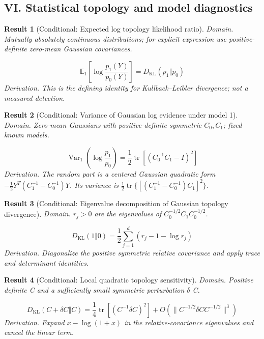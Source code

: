 \documentclass[aps,prd,onecolumn,notitlepage,groupedaddress,11pt]{revtex4-2}
\newtheorem{result}{Result}
\begin{document}
\subsection{VI. Statistical topology and model diagnostics}
\begin{result}[\textsf{Conditional}: Expected log topology likelihood ratio]\label{bridge:36}
\textit{Domain.} Mutually absolutely continuous distributions; for explicit expression use positive-definite zero-mean Gaussian covariances.\par
\begin{equation}\label{bridgeeq:36}
\mathbb E_{1}\left[\log\frac{p_1(Y)}{p_0(Y)}\right]=D_{\mathrm{KL}}(p_1\Vert p_0)
\end{equation}
\textit{Derivation.} This is the defining identity for Kullback--Leibler divergence; not a measured detection.
\end{result}
\begin{result}[\textsf{Conditional}: Variance of Gaussian log evidence under model 1]\label{bridge:37}
\textit{Domain.} Zero-mean Gaussians with positive-definite symmetric \(C_0,C_1\); fixed known models.\par
\begin{equation}\label{bridgeeq:37}
\operatorname{Var}_{1}\left(\log\frac{p_1}{p_0}\right)=\frac12\operatorname{tr}\left[(C_0^{-1}C_1-I)^2\right]
\end{equation}
\textit{Derivation.} The random part is a centered Gaussian quadratic form \(-\tfrac12Y^T(C_1^{-1}-C_0^{-1})Y\). Its variance is \(\tfrac12\operatorname{tr}\{[(C_1^{-1}-C_0^{-1})C_1]^2\}\).
\end{result}
\begin{result}[\textsf{Conditional}: Eigenvalue decomposition of Gaussian topology divergence]\label{bridge:38}
\textit{Domain.} \(r_j>0\) are the eigenvalues of \(C_0^{-1/2}C_1C_0^{-1/2}\).\par
\begin{equation}\label{bridgeeq:38}
D_{\mathrm{KL}}(1\Vert0)=\frac12\sum_{j=1}^{d}(r_j-1-\log r_j)
\end{equation}
\textit{Derivation.} Diagonalize the positive symmetric relative covariance and apply trace and determinant identities.
\end{result}
\begin{result}[\textsf{Conditional}: Local quadratic topology sensitivity]\label{bridge:39}
\textit{Domain.} Positive definite C and a sufficiently small symmetric perturbation \(\delta\) C.\par
\begin{equation}\label{bridgeeq:39}
D_{\mathrm{KL}}(C+\delta C\Vert C)=\frac14\operatorname{tr}[(C^{-1}\delta C)^2]+O(\|C^{-1/2}\delta C C^{-1/2}\|^3)
\end{equation}
\textit{Derivation.} Expand \(x-\log(1+x)\) in the relative-covariance eigenvalues and cancel the linear term.
\end{result}
\end{document}
